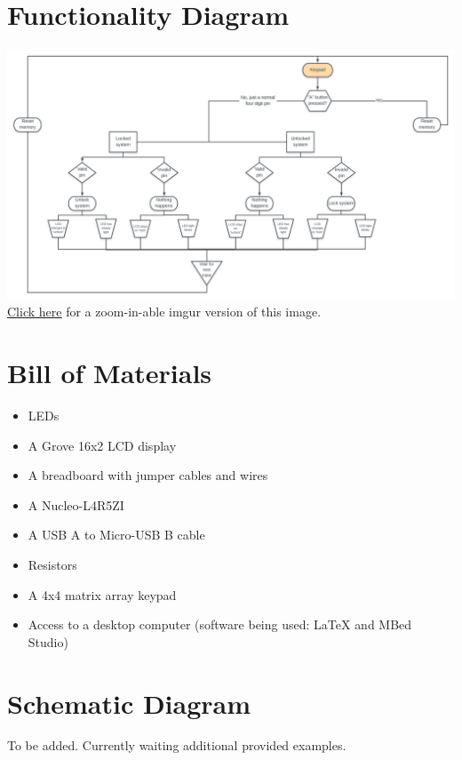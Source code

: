\documentclass[10pt,a4paper]{article}
\begin{document}
\section{Functionality Diagram}
\includegraphics[width=\linewidth]{Flowchart}\\
\href{https://i.imgur.com/xBDfi2t.png}{\underline{Click here}} for a zoom-in-able imgur version of this image.
\pagebreak
\section{Bill of Materials}
\begin{itemize}
	\item LEDs
	\item A Grove 16x2 LCD display
	\item A breadboard with jumper cables and wires
	\item A Nucleo-L4R5ZI
	\item A USB A to Micro-USB B cable
	\item Resistors
	\item A 4x4 matrix array keypad
	\item Access to a desktop computer (software being used: \LaTeX{ }and MBed Studio)
\end{itemize}
\pagebreak
\section{Schematic Diagram}
To be added. Currently waiting additional provided examples.
\pagebreak
\end{document}
